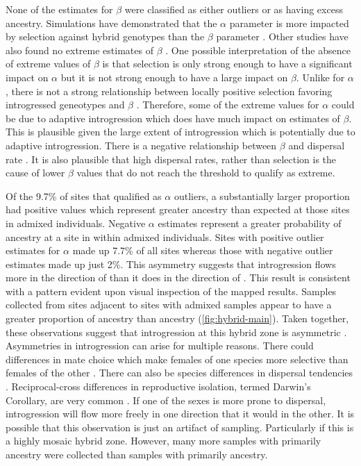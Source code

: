 None of the estimates for $\beta$ were classified as either outliers or as having excess ancestry.
Simulations have demonstrated that the $\alpha$ parameter is more impacted by  
selection against hybrid genotypes than the $\beta$ parameter \parencite{gompert2012a}. 
Other studies have also found no extreme estimates of $\beta$ \parencite{nikolakis2022,gompert2012a}\citationNeeded. 
One possible interpretation of the absence of extreme values of $\beta$ is that
selection is only strong enough to have a significant impact on $\alpha$ but it 
is not strong enough to have a large impact on $\beta$.
Unlike for $\alpha$, there is not a strong relationship between locally positive 
selection favoring introgressed geneotypes and $\beta$ \parencite{gompert2012a}.
Therefore, some of the extreme values for $\alpha$ could be due to adaptive 
introgression which does have much impact on estimates of $\beta$.
This is plausible given the large extent of introgression which is potentially 
due to adaptive introgression.
There is a negative relationship between $\beta$ and dispersal rate \parencite{gompert2012a}.
It is also plausible that high dispersal rates, rather than selection is the 
cause of lower $\beta$ values that do not reach the threshold to qualify as extreme.

Of the 9.7\% of sites that qualified as $\alpha$ outliers, a substantially larger 
proportion had positive values which represent greater \amer ancestry
than expected at those sites in admixed individuals. 
Negative $\alpha$ estimates represent a greater probability of \terr ancestry 
at a site in within admixed individuals.
Sites with positive outlier estimates for $\alpha$ made up 7.7\% of all sites 
whereas those with negative outlier estimates made up just 2\%.
This asymmetry suggests that introgression flows more in the direction of \amer 
than it does in the direction of \terr.
This result is consistent with a pattern evident upon visual inspection of the 
mapped \structure results.
Samples collected from sites adjacent to sites with admixed samples appear to 
have a greater proportion of \amer ancestry than \terr ancestry (\cref{fig:hybrid-main}). 
Taken together, these observations suggest that introgression at this hybrid 
zone is asymmetric \parencite{yang2020}.
Asymmetries in introgression can arise for multiple reasons.
There could differences in mate choice which make females of one species 
more selective than females of the other \parencite{baldassarre2014}. 
There can also be species differences in dispersal tendencies \citationNeeded.  
Reciprocal-cross differences in reproductive isolation, termed Darwin's Corollary,
are very common \parencite{turelli2007}.
If one of the sexes is more prone to dispersal, introgression will flow more 
freely in one direction that it would in the other. 
It is possible that this observation is just an artifact of sampling. 
Particularly if this is a highly mosaic hybrid zone.
However, many more samples with primarily \terr ancestry were collected than 
samples with primarily \amer ancestry. 





